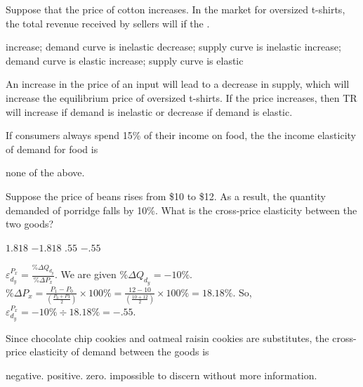 \documentclass[addpoints,11pt]{exam}
\theoremstyle{definition}
\newcommand{\blank}[0]{\underline{\hspace{3cm}}}
\begin{document}
\begin{questions}
	\question Suppose that the price of cotton increases. In the market for oversized t-shirts, the total revenue received by sellers will \blank if the \blank.
	
	\begin{choices}
		\CorrectChoice increase; demand curve is inelastic
		\choice decrease; supply curve is inelastic
		\choice increase; demand curve is elastic
		\choice increase; supply curve is elastic
	\end{choices}
	
		\begin{solution}
			An increase in the price of an input will lead to a decrease in supply, which will increase the equilibrium price of oversized t-shirts. If the price increases, then TR will increase if demand is inelastic or decrease if demand is elastic.
		\end{solution}
		
	
\newpage	

\question If consumers always spend 15\% of their income on food, the the income elasticity of demand for food is 

\begin{choices}
	\choice 0.15
	\CorrectChoice 1.00	
	\choice 1.15
	\choice 1.50
	\choice none of the above.
\end{choices}

\question Suppose the price of beans rises from \$10 to \$12. As a result, the quantity demanded of porridge falls by 10\%. What is the cross-price elasticity between the two goods?

	\begin{choices}
		\choice $1.818$
		\choice $-1.818$
		\choice $.55$
		\CorrectChoice $-.55$
	\end{choices}
	
\begin{solution}
	$\varepsilon_{d_y}^{P_x} = \frac{\%\Delta Q_{d_y}}{\%\Delta P_x}$. We are given $\%\Delta Q_{d_y} = -10\%$. $\%\Delta P_x = \frac{P_1 - P_0}{(\frac{P_0+P1}{2})} \times 100\% = \frac{12 - 10}{(\frac{10+12}{2})} \times 100\% = 18.18\%.$ So, $\varepsilon_{d_y}^{P_x}  = -10\%\div 18.18\% = -.55$.
\end{solution}	

	\question Since chocolate chip cookies and oatmeal raisin cookies are substitutes, the cross-price elasticity of demand between the goods is 
	
	\begin{choices}
		\choice negative.
		\CorrectChoice positive.
		\choice zero.
		\choice impossible to discern without more information.
	\end{choices}



\end{questions}
\end{document}
